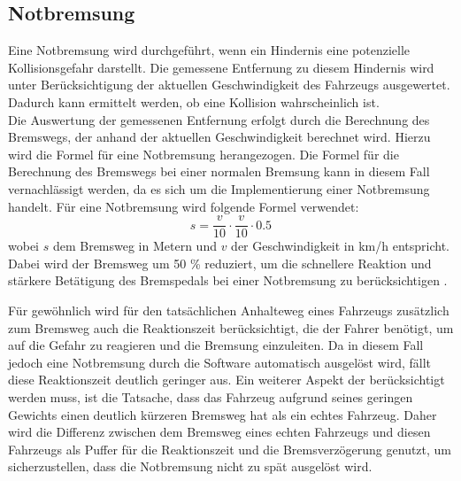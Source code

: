     \subsection{Notbremsung} %
    Eine Notbremsung wird durchgeführt, wenn ein Hindernis eine potenzielle Kollisionsgefahr darstellt. Die gemessene Entfernung zu diesem Hindernis wird unter Berücksichtigung der aktuellen Geschwindigkeit des Fahrzeugs ausgewertet. Dadurch kann ermittelt werden, ob eine Kollision wahrscheinlich ist. \\
    Die Auswertung der gemessenen Entfernung erfolgt durch die Berechnung des Bremswegs, der anhand der aktuellen Geschwindigkeit berechnet wird. Hierzu wird die Formel für eine Notbremsung herangezogen. Die Formel für die Berechnung des Bremswegs bei einer normalen Bremsung kann in diesem Fall vernachlässigt werden, da es sich um die Implementierung einer Notbremsung handelt. Für eine Notbremsung wird folgende Formel verwendet: \\
    \begin{equation}
        s = \frac{v}{10} \cdot \frac{v}{10} \cdot 0.5
    \end{equation} 
    wobei \( s \) dem Bremsweg in Metern und \( v \) der Geschwindigkeit in km/h entspricht. \\
    Dabei wird der Bremsweg um 50 \% reduziert, um die schnellere Reaktion und stärkere Betätigung des Bremspedals bei einer Notbremsung zu berücksichtigen \cite{BremswegBerechnen}. 
    
    Für gewöhnlich wird für den tatsächlichen Anhalteweg eines Fahrzeugs zusätzlich zum Bremsweg auch die Reaktionszeit berücksichtigt, die der Fahrer benötigt, um auf die Gefahr zu reagieren und die Bremsung einzuleiten. Da in diesem Fall jedoch eine Notbremsung durch die Software automatisch ausgelöst wird, fällt diese Reaktionszeit deutlich geringer aus. Ein weiterer Aspekt der berücksichtigt werden muss, ist die Tatsache, dass das Fahrzeug aufgrund seines geringen Gewichts einen deutlich kürzeren Bremsweg hat als ein echtes Fahrzeug. Daher wird die Differenz zwischen dem Bremsweg eines echten Fahrzeugs und diesen Fahrzeugs als Puffer für die Reaktionszeit und die Bremsverzögerung genutzt, um sicherzustellen, dass die Notbremsung nicht zu spät ausgelöst wird.

